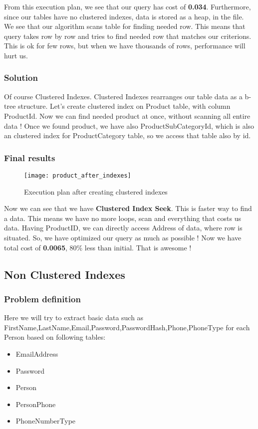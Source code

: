 From this execution plan, we see that our query has cost of \textbf{0.034}. Furthermore, since our tables have no clustered indexes, data is stored as a heap, in the file. We see that our algorithm scans table for finding needed row. This means that query takes row by row and tries to find needed row that matches our criterions. This is ok for few rows, but when we have thousands of rows, performance will hurt us. 

\subsubsection{Solution}
Of course Clustered Indexes. Clustered Indexes rearranges our table data as a b-tree structure. Let's create clustered index on Product table, with column ProductId. Now we can find needed product at once, without scanning all entire data ! Once we found product, we have also ProductSubCategoryId, which is also an clustered index for ProductCategory table, so we access that table also by id.




\subsubsection{Final results}

\begin{figure}[ht!]
	\centering
	\texttt{[image: product\_after\_indexes]}
	\caption{Execution plan after creating clustered indexes}
\end{figure}

Now we can see that we have \textbf{Clustered Index Seek}. This is faster way to find a data. This means we have no more loops, scan and everything that costs us data. Having ProductID, we can directly access Address of data, where row is situated. So, we have optimized our query as much as possible ! Now we have total cost of \textbf{0.0065}, 80\% less than initial. That is awesome !



\subsection{Non Clustered Indexes}
\subsubsection{Problem definition}
Here we will try to extract basic data such as FirstName,LastName,Email,Password,PasswordHash,Phone,PhoneType for each Person based on following tables:
\begin{itemize}
	\item EmailAddress
	\item Password
	\item Person
	\item PersonPhone
	\item PhoneNumberType
\end{itemize}


